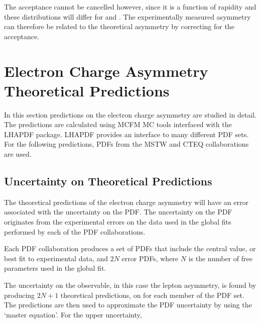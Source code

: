 The acceptance cannot be cancelled however, since it is a function of rapidity and 
these distributions will differ for \Pelectron and \APelectron.
The experimentally measured asymmetry can therefore be related to the
theoretical asymmetry by correcting for the acceptance.


\section{Electron Charge Asymmetry Theoretical Predictions}
\label{sec:asymuncert}

In this section predictions on the electron charge asymmetry are studied in
detail.  The predictions are calculated using MCFM\cite{campbellmcfm} {MC} tools
interfaced with the LHAPDF package\cite{whalley2005houches}.  LHAPDF provides an
interface to many different {PDF} sets. For the following predictions, PDFs from
the MSTW \cite{martin2009parton} and CTEQ \cite{lai2010vv} collaborations are
used.

\subsection{Uncertainty on Theoretical Predictions}
The theoretical predictions of the electron charge asymmetry will have an error
associated with the uncertainty on the {PDF}.
The uncertainty on the {PDF} originates from the experimental errors on the
data used in the global fits performed by each of the {PDF} collaborations.

Each {PDF} collaboration produces a set of {PDFs} that include the
central value, or best fit to experimental data, and $2N$ error {PDFs}, where
$N$ is the number of free parameters used in the global
fit\cite{Bourilkov:2006cj}.

The uncertainty on the observable, in this case the lepton asymmetry, is found
by producing $2N+1$ theoretical predictions, on for each member of the {PDF}
set. The predictions are then used to approximate the {PDF} uncertainty by
using the `master equation'\cite{Bourilkov:2006cj,campbell2006hard}.
For the upper uncertainty,

